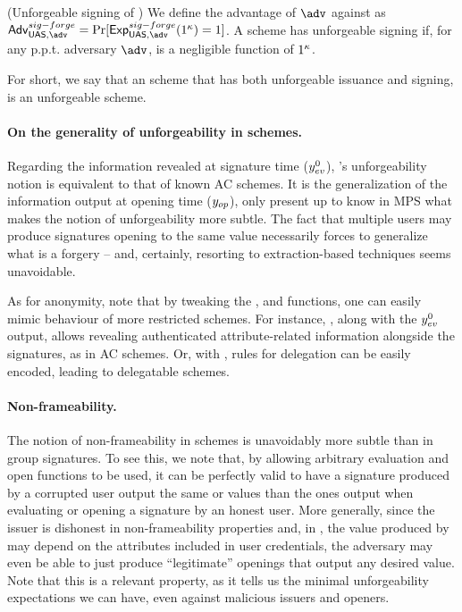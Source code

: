 \begin{definition}{(Unforgeable signing of \UAS)}
  \label{def:sign-forge-uas}  
  We define the advantage \AdvForgeSign of $\adv$ against \ExpForgeSign as
  $\AdvForgeSign=\Pr\lbrack\ExpForgeSign(1^\secpar)=1\rbrack$.
  A \UAS scheme has unforgeable signing if, for any p.p.t. adversary $\adv$,
  \AdvForgeSign is a negligible function of $1^\kappa$.
\end{definition}

For short, we say that an \UAS scheme that has both unforgeable issuance and
signing, is an unforgeable \UAS scheme.

\paragraph{On the generality of unforgeability in \UAS schemes.} %
Regarding the information revealed at signature time ($y_{ev}^0$), \UAS's
unforgeability notion is equivalent to that of known AC schemes. It is the
generalization of the information output at opening time ($y_{op}$), only
present up to know in MPS \needcite what makes the notion of unforgeability more
subtle. The fact that multiple users may produce signatures opening to the same
value necessarily forces to generalize what is a forgery -- and, certainly,
resorting to extraction-based techniques seems unavoidable.

As for anonymity, note that by tweaking the \fissue, \feval and \finsp
functions, one can easily mimic behaviour of more restricted schemes. For
instance, \feval, along with the $y_{ev}^0$ output, allows revealing
authenticated attribute-related information alongside the signatures, as in AC
schemes. Or, with \fissue, rules for delegation can be easily encoded, leading
to delegatable schemes.

\paragraph{Non-frameability.} %
The notion of non-frameability in \UAS schemes is unavoidably more subtle than
in group signatures. To see this, we note that, by allowing arbitrary
evaluation and open functions to be used, it can be perfectly valid to
have a signature produced by a corrupted user output the same \yeval or \yinsp
values than the ones output when evaluating or opening a signature by an honest
user.
%
More generally, since the issuer is dishonest in non-frameability properties
and, in \UAS, the value produced by \Open may depend on the attributes
included in user credentials, the adversary may even be able to just produce
``legitimate'' openings that output any desired value. Note that this is a
relevant property, as it tells us the minimal unforgeability expectations we
can have, even against malicious issuers and openers.

